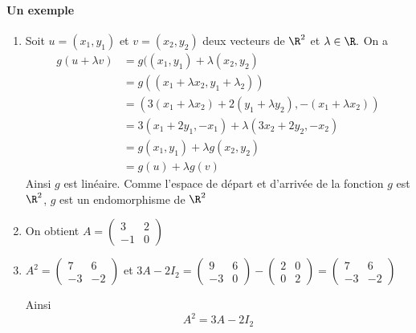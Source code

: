 \documentclass[a4paper, 11pt,reqno]{article}
\begin{document}
\begin{correction}
\paragraph{Un exemple}
\begin{enumerate}
\item Soit $u=(x_1,y_1) $ et $v=(x_2,y_2) $ deux vecteurs de $\R^2$ et $\lambda\in \R.$
On a 
\begin{align*}
g(u+\lambda v) &= g((x_1,y_1)+\lambda (x_2,y_2)\\
						&=  g((x_1 +\lambda x_2,y_1+\lambda _2))\\
						&=(3(x_1 +\lambda x_2)+2(y_1 +\lambda y_2), -(x_1 +\lambda x_2))\\
						&=3(x_1+2y_1,-x_1) +\lambda (3x_2+2y_2,-x_2)\\
						&=g(x_1,y_1) +\lambda g(x_2,y_2)\\
						&= g(u) +\lambda g(v)
\end{align*}
Ainsi $g$ est linéaire. Comme l'espace de départ et d'arrivée de la fonction $g$ est $\R^2$,  $g$ est un endomorphisme de $\R^2$
\item On obtient $A=\begin{pmatrix}
3 & 2\\
-1 & 0
\end{pmatrix}$
\item $A^2 = \begin{pmatrix}
7& 6\\
-3 & -2 
\end{pmatrix}$
et $3A -2I_2 = \begin{pmatrix}
9 & 6\\
-3 & 0
\end{pmatrix} -\begin{pmatrix}
2 & 0\\
0 & 2
\end{pmatrix} = \begin{pmatrix}
7& 6\\
-3 & -2 
\end{pmatrix}$

Ainsi $$A^2 =3A-2I_2$$ 


\end{enumerate}
\end{correction}
\end{document}
